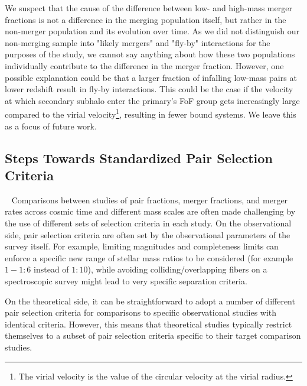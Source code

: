 \documentclass[twocolumn,linenumbers]{aastex631}
\begin{document}
    We suspect that the cause of the difference between low- and high-mass merger fractions is not a difference in the merging population itself, but rather in the non-merger population and its evolution over time. 
    As we did not distinguish our non-merging sample into "likely mergers" and "fly-by" interactions for the purposes of the study, we cannot say anything about how these two populations individually contribute to the difference in the merger fraction.
    However, one possible explanation could be that a larger fraction of infalling low-mass pairs at lower redshift result in fly-by interactions. 
    This could be the case if the velocity at which secondary subhalo enter the primary's FoF group gets increasingly large compared to the virial velocity\footnote{The virial velocity is the value of the circular velocity at the virial radius.}, resulting in fewer bound systems. 
    We leave this as a focus of future work.

    
    \subsection{Steps Towards Standardized Pair Selection Criteria}~\label{sec:disc-previous}
    Comparisons between studies of pair fractions, merger fractions, and merger rates across cosmic time and different mass scales are often made challenging by the use of different sets of selection criteria in each study. 
    On the observational side, pair selection criteria are often set by the observational parameters of the survey itself. 
    For example, limiting magnitudes and completeness limits can enforce a specific new range of stellar mass ratios to be considered (for example $1-1:6$ instead of $1:10$), while avoiding colliding/overlapping fibers on a spectroscopic survey might lead to very specific separation criteria.
    
    On the theoretical side, it can be straightforward to adopt a number of different pair selection criteria for comparisons to specific observational studies with identical criteria. 
    However, this means that theoretical studies typically restrict themselves to a subset of pair selection criteria specific to their target comparison studies.
\end{document}
